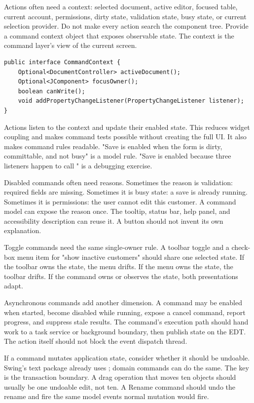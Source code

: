 Actions often need a context: selected document, active editor, focused table, current account, permissions, dirty state, validation state, busy state, or current selection provider. Do not make every action search the component tree. Provide a command context object that exposes observable state. The context is the command layer's view of the current screen.

\begin{lstlisting}[caption={A context object for command enablement.}]
public interface CommandContext {
    Optional<DocumentController> activeDocument();
    Optional<JComponent> focusOwner();
    boolean canWrite();
    void addPropertyChangeListener(PropertyChangeListener listener);
}
\end{lstlisting}

Actions listen to the context and update their enabled state. This reduces widget coupling and makes command tests possible without creating the full UI. It also makes command rules readable. "Save is enabled when the form is dirty, committable, and not busy" is a model rule. "Save is enabled because three listeners happen to call " is a debugging exercise.

Disabled commands often need reasons. Sometimes the reason is validation: required fields are missing. Sometimes it is busy state: a save is already running. Sometimes it is permissions: the user cannot edit this customer. A command model can expose the reason once. The tooltip, status bar, help panel, and accessibility description can reuse it. A button should not invent its own explanation.

Toggle commands need the same single-owner rule. A toolbar toggle and a check-box menu item for "show inactive customers" should share one selected state. If the toolbar owns the state, the menu drifts. If the menu owns the state, the toolbar drifts. If the command owns or observes the state, both presentations adapt.

Asynchronous commands add another dimension. A command may be enabled when started, become disabled while running, expose a cancel command, report progress, and suppress stale results. The command's execution path should hand work to a task service or background boundary, then publish state on the EDT. The action itself should not block the event dispatch thread.

If a command mutates application state, consider whether it should be undoable. Swing's text package already uses ; domain commands can do the same. The key is the transaction boundary. A drag operation that moves ten objects should usually be one undoable edit, not ten. A Rename command should undo the rename and fire the same model events normal mutation would fire.

